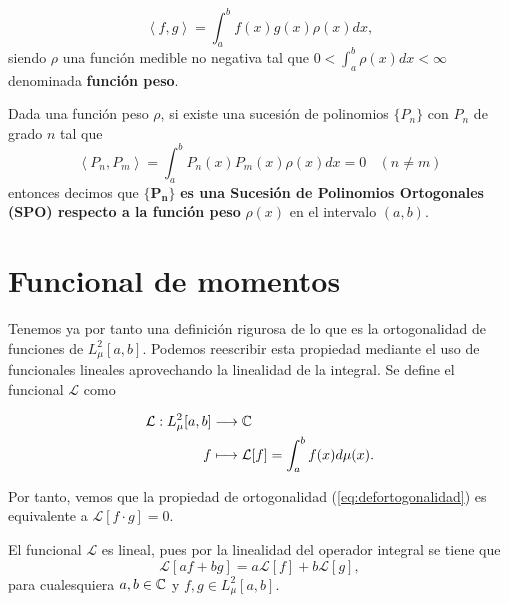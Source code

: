 \begin{equation}
    \label{eq:deffuncionpeso}
    \left\langle f,g \right\rangle=\int_a^b f(x)g(x)\rho(x)dx,
\end{equation}
siendo $\rho$ una función medible no negativa tal que $0<\int_a^b\rho(x)dx<\infty$ denominada \textbf{función peso}.

\begin{definicion}
    \label{def:SPOpeso}
    Dada una función peso $\rho$, si existe una sucesión de polinomios $\{P_n\}$ con $P_n$ de grado $n$ tal que 
    $$
    \left\langle P_n,P_m \right\rangle=\int_a^b P_n(x)P_m(x)\rho(x)dx=0 \ \ \ \ (n\not=m)
    $$
    entonces decimos que $\mathbf{\{P_n\}}$ \textbf{es una Sucesión de Polinomios Ortogonales (SPO) respecto a la función peso} $\rho(x)$ en el intervalo $(a,b)$.  
\end{definicion}

\section{Funcional de momentos}

Tenemos ya por tanto una definición rigurosa de lo que es la ortogonalidad de funciones de $L^2_\mu[a,b]$. Podemos reescribir esta propiedad mediante el uso de funcionales lineales aprovechando la linealidad de la integral. Se define el funcional $\mathcal{L}$ como 

\begin{equation}
    \label{eq:funcionalLineal}
    \begin{split}
        \mathcal{L}:L_\mu^2[a,b]&\longrightarrow \mathbb{C} \\
        f&\longmapsto \mathcal{L}[f]=\int_a^b f(x)d\mu(x).
    \end{split}
\end{equation}

Por tanto, vemos que la propiedad de ortogonalidad (\ref{eq:defortogonalidad}) es equivalente a $\mathcal{L}[f\cdot g]=0$.

\begin{observacion}
    El funcional $\mathcal{L}$ es lineal, pues por la linealidad del operador integral se tiene que
    \begin{equation}
        \label{eq:linealidadfuncional}
        \mathcal{L}[a f + b g]=a\mathcal{L}[f] + b\mathcal{L}[g],
    \end{equation}
    para cualesquiera $a,b\in\mathbb{C}$ y $f,g\in L_\mu^2[a,b]$.
\end{observacion}

